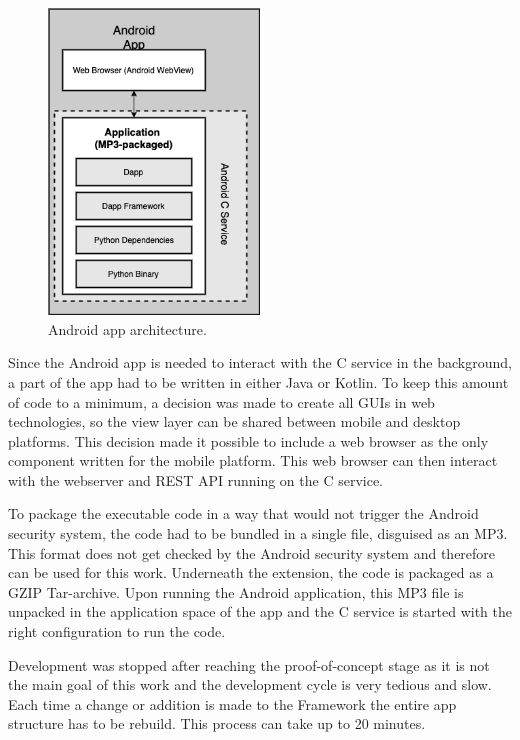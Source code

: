 \begin{figure}[h!]
	\centering
	\includegraphics[width=0.5\textwidth]{images/android-app.png}
	\caption{\label{fig:android-architecture} Android app architecture.}
\end{figure}

Since the Android app is needed to interact with the C service in the background, a part of the app had to be written in either Java or Kotlin. To keep this amount of code to a minimum, a decision was made to create all GUIs in web technologies, so the view layer can be shared between mobile and desktop platforms. This decision made it possible to include a web browser as the only component written for the mobile platform. This web browser can then interact with the webserver and REST API running on the C service.

To package the executable code in a way that would not trigger the Android security system, the code had to be bundled in a single file, disguised as an MP3. This format does not get checked by the Android security system and therefore can be used for this work. Underneath the extension, the code is packaged as a GZIP Tar-archive. Upon running the Android application, this MP3 file is unpacked in the application space of the app and the C service is started with the right configuration to run the code.


Development was stopped after reaching the proof-of-concept stage as it is not the main goal of this work and the development cycle is very tedious and slow. Each time a change or addition is made to the Framework the entire app structure has to be rebuild. This process can take up to 20 minutes. 

